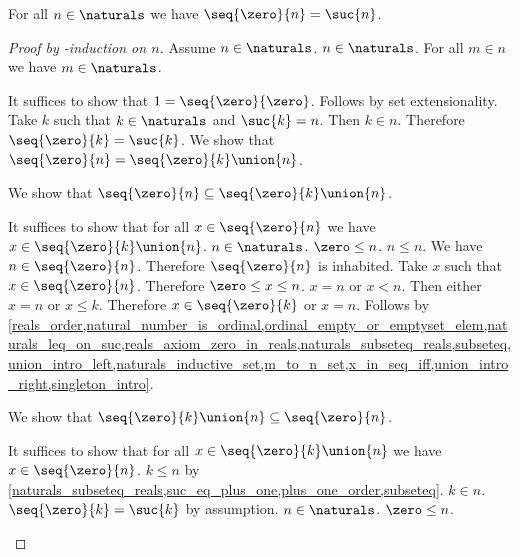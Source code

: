 \begin{proposition}\label{seq_zero_to_n_eq_to_suc_n}
    For all $n \in \naturals$ we have $\seq{\zero}{n} = \suc{n}$.
\end{proposition}
\begin{proof} [Proof by \in-induction on $n$]
    Assume $n \in \naturals$.
    $n \in \naturals$.
    For all $m \in n$ we have $m \in \naturals$.
    \begin{byCase}
            It suffices to show that $1 = \seq{\zero}{\zero}$.
            Follows by set extensionality.
            Take $k$ such that $k \in \naturals$ and $\suc{k} = n$.
            Then $k \in n$.
            Therefore $\seq{\zero}{k} = \suc{k}$.
            We show that $\seq{\zero}{n} = \seq{\zero}{k} \union \{n\}$.
            \begin{subproof}
                We show that $\seq{\zero}{n} \subseteq \seq{\zero}{k} \union \{n\}$.
                \begin{subproof}
                    It suffices to show that for all $x \in \seq{\zero}{n}$ we have $x \in \seq{\zero}{k} \union \{n\}$.
                    $n \in \naturals$.
                    $\zero \leq n$.
                    $n \leq n$.
                    We have $n \in \seq{\zero}{n}$.
                    Therefore $\seq{\zero}{n}$ is inhabited.
                    Take $x$ such that $x \in \seq{\zero}{n}$.
                    Therefore $\zero \leq x \leq n$.
                    $x = n$ or $x < n$.
                    Then either $x = n$ or $x \leq k$.
                    Therefore $x \in \seq{\zero}{k}$ or $x = n$.
                    Follows by \cref{reals_order,natural_number_is_ordinal,ordinal_empty_or_emptyset_elem,naturals_leq_on_suc,reals_axiom_zero_in_reals,naturals_subseteq_reals,subseteq,union_intro_left,naturals_inductive_set,m_to_n_set,x_in_seq_iff,union_intro_right,singleton_intro}.
                \end{subproof}
                We show that $\seq{\zero}{k} \union \{n\} \subseteq \seq{\zero}{n}$.
                \begin{subproof}
                    It suffices to show that for all $x \in \seq{\zero}{k} \union \{n\}$ we have $x \in \seq{\zero}{n}$.
                    $k \leq n$ by \cref{naturals_subseteq_reals,suc_eq_plus_one,plus_one_order,subseteq}.
                    $k \in n$.
                    $\seq{\zero}{k} = \suc{k}$ by assumption.            
                    $n \in \naturals$.
                    $\zero \leq n$.

\end{subproof}
\end{subproof}
\end{byCase}
\end{proof}

